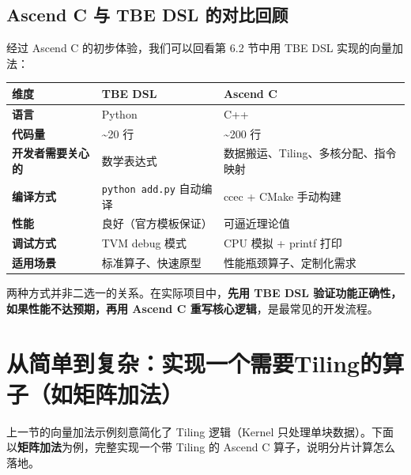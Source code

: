 \subsection{Ascend C 与 TBE DSL 的对比回顾}\label{src-book-chapter7-h51}

经过 Ascend C 的初步体验，我们可以回看第 6.2 节中用 TBE DSL
实现的向量加法：

\begin{longtable}[]{@{}
  >{\raggedright\arraybackslash}p{}
  >{\raggedright\arraybackslash}p{}
  >{\raggedright\arraybackslash}p{}@{}}
\toprule\noalign{}
\begin{minipage}[b]{\linewidth}\raggedright
维度
\end{minipage} & \begin{minipage}[b]{\linewidth}\raggedright
TBE DSL
\end{minipage} & \begin{minipage}[b]{\linewidth}\raggedright
Ascend C
\end{minipage} \\
\midrule\noalign{}
\endhead
\bottomrule\noalign{}
\endlastfoot
\textbf{语言} & Python & C++ \\
\textbf{代码量} & \textasciitilde20 行 & \textasciitilde200 行 \\
\textbf{开发者需要关心的} & 数学表达式 &
数据搬运、Tiling、多核分配、指令映射 \\
\textbf{编译方式} & \passthrough{\lstinline!python add.py!} 自动编译 &
ccec + CMake 手动构建 \\
\textbf{性能} & 良好（官方模板保证） & 可逼近理论值 \\
\textbf{调试方式} & TVM debug 模式 & CPU 模拟 + printf 打印 \\
\textbf{适用场景} & 标准算子、快速原型 & 性能瓶颈算子、定制化需求 \\
\end{longtable}

两种方式并非二选一的关系。在实际项目中，\textbf{先用 TBE DSL
验证功能正确性，如果性能不达预期，再用 Ascend C
重写核心逻辑}，是最常见的开发流程。

\section{从简单到复杂：实现一个需要Tiling的算子（如矩阵加法）}\label{src-book-chapter7-h52}

上一节的向量加法示例刻意简化了 Tiling 逻辑（Kernel
只处理单块数据）。下面以\textbf{矩阵加法}为例，完整实现一个带 Tiling 的
Ascend C 算子，说明分片计算怎么落地。

